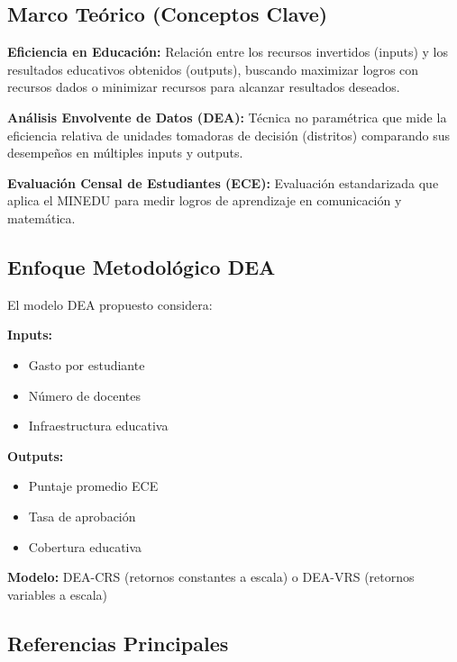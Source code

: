 \documentclass[
  man,
  floatsintext,
  longtable,
  a4paper,
  nolmodern,
  notxfonts,
  notimes,
  12pt,
  colorlinks=true,linkcolor=blue,citecolor=blue,urlcolor=blue]{apa7}
\providecommand{\tightlist}{%
  \setlength{\itemsep}{0pt}\setlength{\parskip}{0pt}}
\begin{document}
\subsection{Marco Teórico (Conceptos
Clave)}\label{marco-teuxf3rico-conceptos-clave-2}

\textbf{Eficiencia en Educación:} Relación entre los recursos invertidos
(inputs) y los resultados educativos obtenidos (outputs), buscando
maximizar logros con recursos dados o minimizar recursos para alcanzar
resultados deseados.

\textbf{Análisis Envolvente de Datos (DEA):} Técnica no paramétrica que
mide la eficiencia relativa de unidades tomadoras de decisión
(distritos) comparando sus desempeños en múltiples inputs y outputs.

\textbf{Evaluación Censal de Estudiantes (ECE):} Evaluación
estandarizada que aplica el MINEDU para medir logros de aprendizaje en
comunicación y matemática.

\subsection{Enfoque Metodológico DEA}\label{enfoque-metodoluxf3gico-dea}

El modelo DEA propuesto considera:

\textbf{Inputs:}

\begin{itemize}
\tightlist
\item
  Gasto por estudiante
\item
  Número de docentes
\item
  Infraestructura educativa
\end{itemize}

\textbf{Outputs:}

\begin{itemize}
\tightlist
\item
  Puntaje promedio ECE
\item
  Tasa de aprobación
\item
  Cobertura educativa
\end{itemize}

\textbf{Modelo:} DEA-CRS (retornos constantes a escala) o DEA-VRS
(retornos variables a escala)

\subsection{Referencias Principales}\label{referencias-principales-2}
\end{document}
